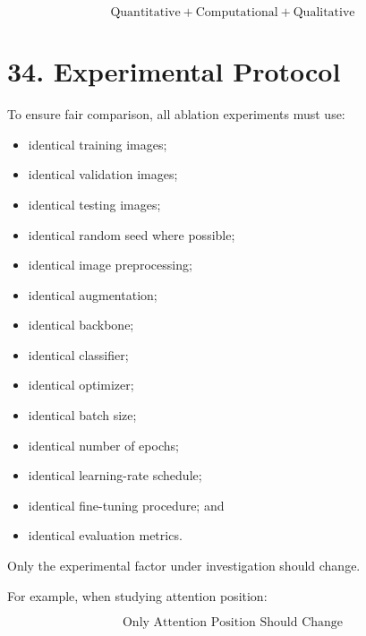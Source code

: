 \documentclass[10pt]{article}
\begin{document}
\[
\boxed{
\text{Quantitative}
+
\text{Computational}
+
\text{Qualitative}
}
\]

\section*{34. Experimental Protocol}

To ensure fair comparison, all ablation experiments must use:

\begin{itemize}

\item identical training images;

\item identical validation images;

\item identical testing images;

\item identical random seed where possible;

\item identical image preprocessing;

\item identical augmentation;

\item identical backbone;

\item identical classifier;

\item identical optimizer;

\item identical batch size;

\item identical number of epochs;

\item identical learning-rate schedule;

\item identical fine-tuning procedure; and

\item identical evaluation metrics.

\end{itemize}

Only the experimental factor under investigation should change.

For example, when studying attention position:

\[
\boxed{
\text{Only Attention Position Should Change}
}
\]
\end{document}
